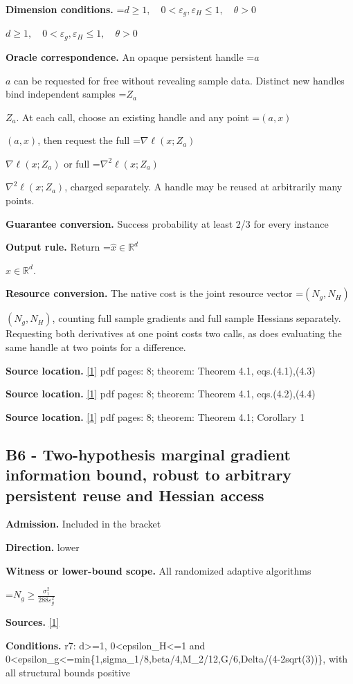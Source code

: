 \documentclass[10pt,a4paper]{article}
\newcommand{\AtlasMath}[1]{\par\begingroup\centering\setbox0=\hbox{$\displaystyle #1$}\ifdim\wd0>1.4\linewidth\typeout{ATLAS WIDE FORMULA: \the\wd0}\fi\ifdim\wd0>\linewidth\resizebox{\linewidth}{!}{\box0}\else\box0\fi\par\endgroup}
\newcommand{\AtlasInlineMath}[1]{\begingroup\setbox0=\hbox{$#1$}\ifdim\wd0>.4\linewidth\endgroup\AtlasMath{#1}\else\endgroup$#1$\fi}
\begin{document}
\textbf{Dimension conditions.} \AtlasInlineMath{d\ge1,\quad0<\varepsilon_g,\varepsilon_H\le1,\quad\theta>0}

\textbf{Oracle correspondence.} An opaque persistent handle \AtlasInlineMath{a} can be requested for free without revealing sample data. Distinct new handles bind independent samples \AtlasInlineMath{Z_a}. At each call, choose an existing handle and any point \AtlasInlineMath{(a,x)}, then request the full \AtlasInlineMath{\nabla\ell(x;Z_a)} or full \AtlasInlineMath{\nabla^2\ell(x;Z_a)}, charged separately. A handle may be reused at arbitrarily many points.

\textbf{Guarantee conversion.} Success probability at least 2/3 for every instance

\textbf{Output rule.} Return \AtlasInlineMath{\widehat{x}\in \mathbb{R}^d}.

\textbf{Resource conversion.} The native cost is the joint resource vector \AtlasInlineMath{(N_g,N_H)}, counting full sample gradients and full sample Hessians separately. Requesting both derivatives at one point costs two calls, as does evaluating the same handle at two points for a difference.

\textbf{Source location.} \href{https://arxiv.org/pdf/2610.16832v2}{[1]} pdf pages: 8; theorem: Theorem 4.1, eqs.(4.1),(4.3)

\textbf{Source location.} \href{https://arxiv.org/pdf/2610.16832v2}{[1]} pdf pages: 8; theorem: Theorem 4.1, eqs.(4.2),(4.4)

\textbf{Source location.} \href{https://arxiv.org/pdf/2610.16832v2}{[1]} pdf pages: 8; theorem: Theorem 4.1; Corollary 1

\subsection{B6 - Two-hypothesis marginal gradient information bound, robust to arbitrary persistent reuse and Hessian access}
\textbf{Admission.} Included in the bracket

\textbf{Direction.} lower

\textbf{Witness or lower-bound scope.} All randomized adaptive algorithms

\AtlasMath{N_g\ge\frac{\sigma_1^2}{288\varepsilon_g^2}}
\textbf{Sources.} \href{https://arxiv.org/pdf/2610.16832v2}{[1]}

\textbf{Conditions.} r7: d>=1, 0<epsilon\_\allowbreak{}H<=1 and 0<epsilon\_\allowbreak{}g<=min\{1,sigma\_\allowbreak{}1/8,beta/4,M\_\allowbreak{}2/12,G/6,Delta/(4-2sqrt(3))\}, with all structural bounds positive
\end{document}

